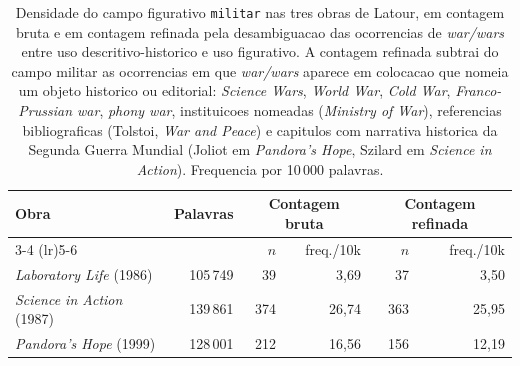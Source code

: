 
\begin{table}[ht]
\centering
\caption[Densidade do campo militar nas tres obras de Latour, com desambiguacao de \emph{war/wars}]{Densidade do campo figurativo \texttt{militar} nas tres obras de Latour, em contagem bruta e em contagem refinada pela desambiguacao das ocorrencias de \emph{war/wars} entre uso descritivo-historico e uso figurativo. A contagem refinada subtrai do campo militar as ocorrencias em que \emph{war/wars} aparece em colocacao que nomeia um objeto historico ou editorial: \emph{Science Wars}, \emph{World War}, \emph{Cold War}, \emph{Franco-Prussian war}, \emph{phony war}, instituicoes nomeadas (\emph{Ministry of War}), referencias bibliograficas (Tolstoi, \emph{War and Peace}) e capitulos com narrativa historica da Segunda Guerra Mundial (Joliot em \emph{Pandora's Hope}, Szilard em \emph{Science in Action}). Frequencia por 10\,000 palavras.}
\label{tab:militar-refinado}
\begin{tabular}{lrrrrr}
\toprule
Obra & Palavras & \multicolumn{2}{c}{Contagem bruta} & \multicolumn{2}{c}{Contagem refinada} \\
\cmidrule(lr){3-4} \cmidrule(lr){5-6}
 & & $n$ & freq./10k & $n$ & freq./10k \\
\midrule
\emph{Laboratory Life} (1986) & 105\,749 & 39 & 3{,}69 & 37 & 3{,}50 \\
\emph{Science in Action} (1987) & 139\,861 & 374 & 26{,}74 & 363 & 25{,}95 \\
\emph{Pandora's Hope} (1999) & 128\,001 & 212 & 16{,}56 & 156 & 12{,}19 \\
\bottomrule
\end{tabular}
\end{table}
